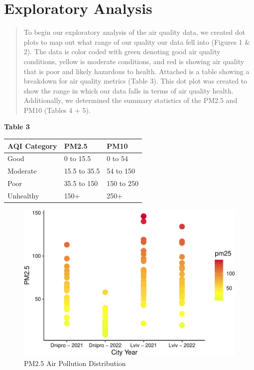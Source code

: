 \documentclass[
  12pt,
]{article}
\begin{document}
\newpage

\hypertarget{exploratory-analysis}{%
\section{Exploratory Analysis}\label{exploratory-analysis}}

\begin{quote}
To begin our exploratory analysis of the air quality data, we created
dot plots to map out what range of our quality our data fell into
(Figures 1 \& 2). The data is color coded with green denoting good air
quality conditions, yellow is moderate conditions, and red is showing
air quality that is poor and likely hazardous to health. Attached is a
table showing a breakdown for air quality metrics (Table 3). This dot
plot was created to show the range in which our data falls in terms of
air quality health. Additionally, we determined the summary statistics
of the PM2.5 and PM10 (Tables 4 + 5).
\end{quote}

\textbf{Table 3}

\begin{longtable}[]{@{}lll@{}}
\toprule
AQI Category & PM2.5 & PM10 \\
\midrule
\endhead
Good & 0 to 15.5 & 0 to 54 \\
Moderate & 15.5 to 35.5 & 54 to 150 \\
Poor & 35.5 to 150 & 150 to 250 \\
Unhealthy & 150+ & 250+ \\
\bottomrule
\end{longtable}

\newpage

\begin{figure}
\centering
\includegraphics{Fontanie_Gordon_Weinberg_Project_files/figure-latex/plot of PM25 air pollution by cityyear-1.pdf}
\caption{PM2.5 Air Pollution Distribution}
\end{figure}
\end{document}
